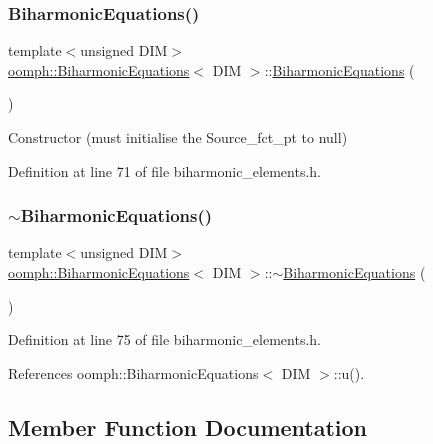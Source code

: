 \subsubsection{\texorpdfstring{Biharmonic\+Equations()}{BiharmonicEquations()}}
{\footnotesize\ttfamily template$<$unsigned D\+IM$>$ \\
\hyperlink{classoomph_1_1BiharmonicEquations}{oomph\+::\+Biharmonic\+Equations}$<$ D\+IM $>$\+::\hyperlink{classoomph_1_1BiharmonicEquations}{Biharmonic\+Equations} (\begin{DoxyParamCaption}{ }\end{DoxyParamCaption})\hspace{0.3cm}{\ttfamily [inline]}}



Constructor (must initialise the Source\+\_\+fct\+\_\+pt to null) 



Definition at line 71 of file biharmonic\+\_\+elements.\+h.

\mbox{\label{classoomph_1_1BiharmonicEquations_a8e0024f4f9cd62f63515cd24f3c6af1e}} 
\subsubsection{\texorpdfstring{$\sim$\+Biharmonic\+Equations()}{~BiharmonicEquations()}}
{\footnotesize\ttfamily template$<$unsigned D\+IM$>$ \\
\hyperlink{classoomph_1_1BiharmonicEquations}{oomph\+::\+Biharmonic\+Equations}$<$ D\+IM $>$\+::$\sim$\hyperlink{classoomph_1_1BiharmonicEquations}{Biharmonic\+Equations} (\begin{DoxyParamCaption}{ }\end{DoxyParamCaption})\hspace{0.3cm}{\ttfamily [inline]}}



Definition at line 75 of file biharmonic\+\_\+elements.\+h.



References oomph\+::\+Biharmonic\+Equations$<$ D\+I\+M $>$\+::u().



\subsection{Member Function Documentation}
\mbox{\label{classoomph_1_1BiharmonicEquations_a914c46acc12aeea7d4b6288eceef1b5b}} 
